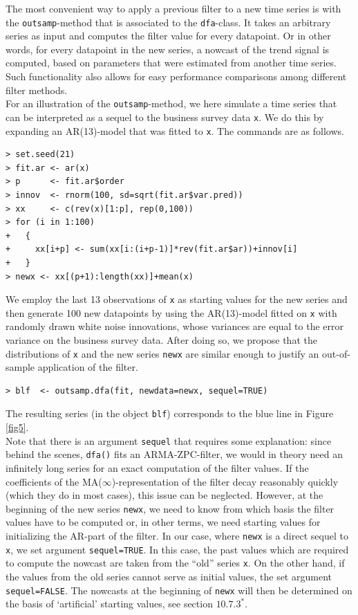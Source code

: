 \documentclass[a4paper]{article}
\begin{document}
The most convenient way to apply a previous filter to a new time
series is with the \texttt{outsamp}-method that is associated to the
\texttt{dfa}-class. It takes an arbitrary series as input and computes
the filter value for every datapoint. Or in other words, for every
datapoint in the new series, a nowcast of the trend signal is
computed, based on parameters that were estimated from another time
series. Such functionality also allows for easy performance
comparisons among different filter methods.\\

For an illustration of the \texttt{outsamp}-method, we here simulate a
time series that can be interpreted as a sequel to the business survey
data \texttt{x}. We do this by expanding an AR(13)-model that was
fitted to \texttt{x}. The commands are as follows. 

\begin{verbatim}
> set.seed(21)
> fit.ar <- ar(x)
> p      <- fit.ar$order
> innov  <- rnorm(100, sd=sqrt(fit.ar$var.pred))
> xx     <- c(rev(x)[1:p], rep(0,100))
> for (i in 1:100)
+   {
+     xx[i+p] <- sum(xx[i:(i+p-1)]*rev(fit.ar$ar))+innov[i]
+   }
> newx <- xx[(p+1):length(xx)]+mean(x)
\end{verbatim} %

We employ the last 13 observations of \texttt{x} as starting values
for the new series and then generate 100 new datapoints by using the
AR(13)-model fitted on \texttt{x} with randomly drawn white noise
innovations, whose variances are equal to the error variance on the
business survey data. After doing so, we propose that the
distributions of \texttt{x} and the new series \texttt{newx} are
similar enough to justify an out-of-sample application of the filter. 

\begin{verbatim}
> blf  <- outsamp.dfa(fit, newdata=newx, sequel=TRUE)
\end{verbatim}
The resulting series (in the object \texttt{blf}) corresponds to the
blue line in Figure \ref{fig5}.\\

Note that there is an argument \texttt{sequel} that requires some
explanation: since behind the scenes, \texttt{dfa()} fits an
ARMA-ZPC-filter, we would in theory need an infinitely long series for
an exact computation of the filter values.  If the coefficients of the
MA($\infty$)-representation of the filter decay reasonably quickly
(which they do in most cases), this issue can be neglected. However,
at the beginning of the new series \texttt{newx}, we need to know from
which basis the filter values have to be computed or, in other terms,
we need starting values for initializing the AR-part of the filter. In
our case, where \texttt{newx} is a direct sequel to \texttt{x}, we set
argument \texttt{sequel=TRUE}. In this case, the past values which are
required to compute the nowcast are taken from the ``old'' series
\texttt{x}. On the other hand, if the values from the old series
cannot serve as initial values, the set argument
\texttt{sequel=FALSE}. The nowcasts at the beginning of \texttt{newx}
will then be determined on the basis of `artificial' starting values,
see section $10.7.3^*$. 



\end{document}
